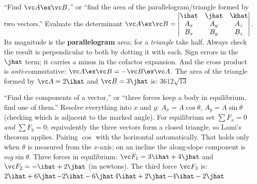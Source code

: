 {``Find $\vc A\ex\vc B$,'' or ``find the area of the parallelogram/triangle formed by two vectors.''}
{Evaluate the determinant
$\vc A\ex\vc B=\begin{vmatrix}\ihat&\jhat&\khat\\ A_x&A_y&A_z\\ B_x&B_y&B_z\end{vmatrix}$.
Its magnitude is the \textbf{parallelogram} area; for a \emph{triangle} take half. Always check the
result is perpendicular to both by dotting it with each.}
{Sign errors in the $\jhat$ term; it carries a minus in the cofactor expansion. And the cross product
is \emph{anti}-commutative: $\vc A\ex\vc B=-\vc B\ex\vc A$.}
{The area of the triangle formed by $\vc A=2\ihat$ and $\vc B=3\jhat$ is:}
{$3$}{$6$}{$12$}{$\sqrt{13}$}

{``Find the components of a vector,'' or ``three forces keep a body in equilibrium, find one of
them.''}
{Resolve everything into $x$ and $y$: $A_x=A\cos\theta$, $A_y=A\sin\theta$ (checking which is adjacent to
the marked angle). For equilibrium set $\sum F_x=0$ \emph{and} $\sum F_y=0$; equivalently the three
vectors form a closed triangle, so Lami's theorem applies.}
{Pairing $\cos$ with the horizontal automatically. That holds only when $\theta$ is measured from the
$x$-axis; on an incline the along-slope component is $mg\sin\theta$.}
{Three forces in equilibrium: $\vc F_1=3\ihat+4\jhat$ and $\vc F_2=-\ihat+2\jhat$ (in newtons). The
third force $\vc F_3$ is:}
{$2\ihat+6\jhat$}{$-2\ihat-6\jhat$}{$4\ihat+2\jhat$}{$-4\ihat-2\jhat$}
